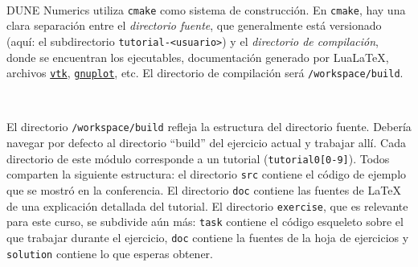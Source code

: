 \documentclass[9pt,a3paper]{scrartcl}
\begin{document}
\

DUNE Numerics utiliza \verb!cmake! como sistema de construcción.
En \verb!cmake!, hay una clara separación entre el
\textit{directorio fuente}, que generalmente está versionado
(aquí: el subdirectorio \verb!tutorial-<usuario>!) y el
\textit{directorio de compilación}, donde se encuentran los
ejecutables, documentación generado por Lua\LaTeX{}, archivos
\href {https://vtk.org}{\texttt{vtk}},
\href{http://www.gnuplot.info}{\texttt{gnuplot}}, etc.
El directorio de compilación será \verb!/workspace/build!.

\

El directorio \verb!/workspace/build! refleja la estructura del
directorio fuente.
Debería navegar por defecto al directorio ``build'' del ejercicio
actual y trabajar allí.
Cada directorio de este módulo corresponde a un tutorial
(\verb!tutorial0[0-9]!).
Todos comparten la siguiente estructura: el directorio \verb!src!
contiene el código de ejemplo que se mostró en la conferencia.
El directorio \verb!doc! contiene las fuentes de \LaTeX{} de una
explicación detallada del tutorial.
El directorio \verb!exercise!, que es relevante para este curso, se
subdivide aún más: \verb!task! contiene el código esqueleto sobre el
que trabajar durante el ejercicio, \verb!doc! contiene la fuentes de
la hoja de ejercicios y \verb!solution! contiene lo que esperas
obtener.

\
\end{document}
